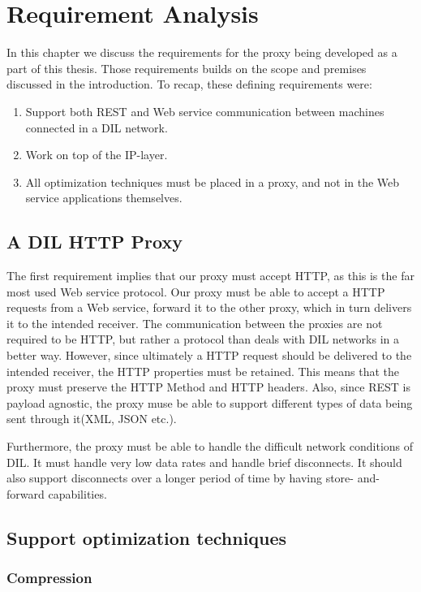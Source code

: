 \chapter{Requirement Analysis}

In this chapter we discuss the requirements for the proxy being developed as a
part of this thesis. Those requirements builds on the scope and premises
discussed in the introduction. To recap, these defining requirements were:

\begin{enumerate}
    \item Support both REST and Web service communication between machines connected in a DIL network.
    \item Work on top of the IP-layer.
    \item All optimization techniques must be placed in a proxy, and not in the Web service applications themselves.
\end{enumerate}

\section{A DIL HTTP Proxy}

The first requirement implies that our proxy must accept HTTP, as this is the
far most used Web service protocol. Our proxy must be able to accept a HTTP
requests from a Web service, forward it to the other proxy, which in turn
delivers it to the intended receiver. The communication between the proxies are
not required to be HTTP, but rather a protocol than deals with DIL networks in a
better way. However, since ultimately a HTTP request should be delivered to the
intended receiver, the HTTP properties must be retained. This means that the
proxy must preserve the HTTP Method and HTTP headers. Also, since REST is
payload agnostic, the proxy muse be able to support different types of data
being sent through it(XML, JSON etc.).

Furthermore, the proxy must be able to handle the difficult network conditions
of DIL. It must handle very low data rates and handle brief disconnects. It
should also support disconnects over a longer period of time by having store-
and-forward capabilities.

\section{Support optimization techniques}

\subsection{Compression}

